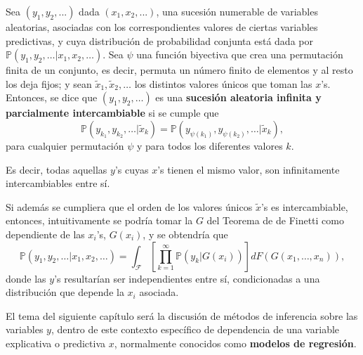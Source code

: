 \begin{defin*}
    Sea $(y_1,y_2,...)$ dada $(x_1,x_2,...)$, una sucesi\'on numerable de variables aleatorias, asociadas con los correspondientes valores de ciertas variables predictivas, y cuya distribuci\'on de probabilidad conjunta est\'a dada por $\mathbb{P}(y_1,y_2,\ldots|x_1,x_2,\ldots)$. Sea $\psi$ una funci\'on biyectiva que crea una permutaci\'on finita de un conjunto, es decir, permuta un n\'umero finito de elementos y al resto los deja fijos; y sean $\tilde{x}_1,\tilde{x}_2,\ldots$ los distintos valores \'unicos que toman las $x$'s.  
    Entonces, se dice que $(y_1,y_2,\ldots)$ es una \textbf{sucesi\'on aleatoria infinita y parcialmente intercambiable} si se cumple que 
    \begin{equation*}
        \mathbb{P}(y_{k_1},y_{k_2},\ldots|\tilde{x}_k) = \mathbb{P}(y_{\psi(k_1)},y_{\psi(k_2)},\ldots|\tilde{x}_k),
    \end{equation*}
    para cualquier permutaci\'on $\psi$ y para todos los diferentes valores $k$.
    
    Es decir, todas aquellas $y$'s cuyas $x$'s tienen el mismo valor, son infinitamente intercambiables entre s\'i. 
\end{defin*}

Si adem\'as se cumpliera que el orden de los valores \'unicos $\tilde{x}$'s es intercambiable, entonces, intuitivamente se podr\'ia tomar la $G$ del Teorema de de Finetti como dependiente de las $x_i$'s, $G(x_i)$, y se obtendr\'ia que
\begin{equation*}
    \mathbb{P}(y_1,y_2,\ldots|x_1,x_2,\ldots) =
    \int_{\mathcal{F}}\left[\prod_{k=1}^\infty \mathbb{P}(y_k|G(x_i))\right]dF(G(x_1,\ldots,x_n)),
\end{equation*}
donde las $y$'s resultar\'ian ser independientes entre s\'i, condicionadas a una distribuci\'on que depende la $x_i$ asociada.

El tema del siguiente cap\'itulo ser\'a la discusi\'on de m\'etodos de inferencia sobre las variables $y$, dentro de este contexto espec\'ifico de dependencia de una variable explicativa o predictiva $x$, normalmente conocidos como \textbf{modelos de regresi\'on}.

\newpage